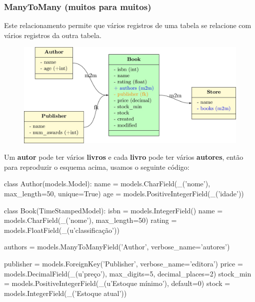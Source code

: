 \documentclass[aspectratio=169]{beamer}
\begin{document}
{\begin{frame}[fragile]
\begin{pythoncode}
\end{pythoncode}

\end{frame}

\begin{frame}\frametitle{ManyToMany (muitos para muitos)}
	
Este relacionamento permite que vários registros de uma tabela se relacione com vários registros da outra tabela.

	\begin{figure}[h]
	  \centering
  		\includegraphics[width=.75\paperwidth]{img/03m2m.jpg}
	\end{figure}

Um \textbf{autor} pode ter vários \textbf{livros} e cada \textbf{livro} pode ter vários \textbf{autores}, então para reproduzir o esquema acima, usamos o seguinte código:
\end{frame}

\begin{frame}[fragile]

\begin{pythoncode}
class Author(models.Model):
    name = models.CharField(_('nome'), max_length=50, unique=True)
    age = models.PositiveIntegerField(_('idade'))


class Book(TimeStampedModel):
    isbn = models.IntegerField()
    name = models.CharField(_('nome'), max_length=50)
    rating = models.FloatField(_(u'classificação'))

    authors = models.ManyToManyField('Author',
                                     verbose_name='autores')

    publisher = models.ForeignKey('Publisher', verbose_name='editora')
    price = models.DecimalField(_(u'preço'), max_digits=5, decimal_places=2)
    stock_min = models.PositiveIntegerField(_(u'Estoque mínimo'), default=0)
    stock = models.IntegerField(_('Estoque atual'))
\end{pythoncode}


\end{frame}}
\end{document}
